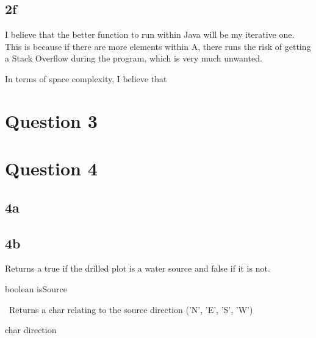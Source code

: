 \documentclass[oneside, a4paper]{article}
\begin{document}
\subsection*{2f}
I believe that the better function to run within Java will be my iterative one. This is because if there are more elements within A, there runs the risk of getting a Stack Overflow during the program, which is very much unwanted. 

In terms of space complexity, I believe that 


\section*{Question 3}
\section*{Question 4}
\subsection*{4a}
\subsection*{4b}

Returns a true if the drilled plot is a water source and false if it is not.
\begin{algorithmic}[1]
    \State \Return boolean isSource
    \EndFunction
\end{algorithmic}

\
Returns a char relating to the source direction ('N', 'E', 'S', 'W')
\begin{algorithmic}[1]
    \State \Return char direction
    \EndFunction
\end{algorithmic}

\
\begin{algorithmic}[1]
    \State

    \EndFunction
\end{algorithmic}
\end{document}
